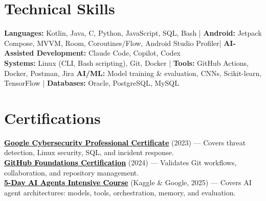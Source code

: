 \documentclass[a4paper]{article}
\begin{document}
\section{Technical Skills}
\begin{itemize}[leftmargin=0.15in, label={}]
\small{\item{
\textbf{Languages:} Kotlin, Java, C, Python, JavaScript, SQL, Bash \;|\;
\textbf{Android:} Jetpack Compose, MVVM, Room, Coroutines/Flow, Android Studio Profiler\;|\; \textbf{AI-Assisted Development:} Claude Code, Copilot, Codex\\
\textbf{Systems:} Linux (CLI, Bash scripting), Git, Docker \;|\;
\textbf{Tools:} GitHub Actions, Docker, Postman, Jira
\textbf{AI/ML:} Model training \& evaluation, CNNs, Scikit-learn, TensorFlow \;|\;
\textbf{Databases:} Oracle, PostgreSQL, MySQL
}}
\end{itemize}




\section{Certifications}
 \begin{itemize}[leftmargin=0.15in, label={}]
    \small{\item{
    \href{https://coursera.org/share/44fd8f381cb39ac45892569cdf6f7674}{\textcolor{black}{\textbf{Google Cybersecurity Professional Certificate}}} (2023) --- Covers threat detection, Linux security, SQL, and incident response. \\
    \href{https://www.credly.com/badges/d5c30c19-02db-4c5f-9bc9-4bd0f4b6a89e/public_url}{\textcolor{black}{\textbf{GitHub Foundations Certification}}} (2024) --- Validates Git workflows, collaboration, and repository management. \\
    \href{https://www.kaggle.com/certification/badges/badhon495/105}{\textcolor{black}{\textbf{5-Day AI Agents Intensive Course}}} (Kaggle \& Google, 2025) --- Covers AI agent architectures: models, tools, orchestration, memory, and evaluation.
    }}
 \end{itemize}


\end{document}

